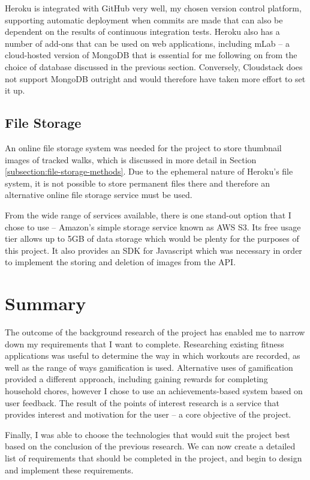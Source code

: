 Heroku is integrated with GitHub very well, my chosen version control platform, supporting automatic deployment when commits are made that can also be dependent on the results of continuous integration tests. Heroku also has a number of add-ons that can be used on web applications, including mLab -- a cloud-hosted version of MongoDB that is essential for me following on from the choice of database discussed in the previous section. Conversely, Cloudstack does not support MongoDB outright and would therefore have taken more effort to set it up.

\subsection{File Storage}

An online file storage system was needed for the project to store thumbnail images of tracked walks, which is discussed in more detail in Section \ref{subsection:file-storage-methods}. Due to the ephemeral nature of Heroku's file system, it is not possible to store permanent files there and therefore an alternative online file storage service must be used.

From the wide range of services available, there is one stand-out option that I chose to use -- Amazon's simple storage service known as AWS S3. Its free usage tier allows up to 5GB of data storage which would be plenty for the purposes of this project. It also provides an SDK for Javascript which was necessary in order to implement the storing and deletion of images from the API.

\section{Summary}

The outcome of the background research of the project has enabled me to narrow down my requirements that I want to complete. Researching existing fitness applications was useful to determine the way in which workouts are recorded, as well as the range of ways gamification is used. Alternative uses of gamification provided a different approach, including gaining rewards for completing household chores, however I chose to use an achievements-based system based on user feedback. The result of the points of interest research is a service that provides interest and motivation for the user -- a core objective of the project.

Finally, I was able to choose the technologies that would suit the project best based on the conclusion of the previous research. We can now create a detailed list of requirements that should be completed in the project, and begin to design and implement these requirements.






